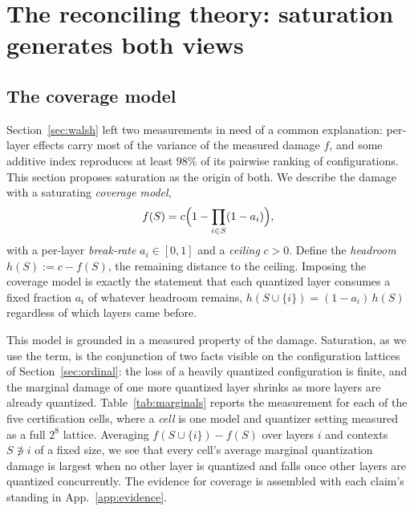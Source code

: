 

\section{The reconciling theory: saturation generates both views}\label{sec:theory}

\subsection{The coverage model}\label{sec:coverage}

Section~\ref{sec:walsh} left two measurements in need of a common explanation: per-layer effects carry
most of the variance of the measured damage $f$, and some additive index reproduces at least $98\%$ of
its pairwise ranking of configurations. This section proposes saturation as the origin of both. We describe the damage with a saturating \emph{coverage model},
\begin{equation}
  f(S) = c\Bigl(1 - \prod_{i\in S}(1 - a_i)\Bigr),
  \label{eq:coverage}
\end{equation}
with a per-layer \emph{break-rate} $a_i\in[0,1]$ and a \emph{ceiling} $c>0$. Define the \emph{headroom}
$h(S) := c - f(S)$, the remaining distance to the ceiling. Imposing the coverage model is exactly the
statement that each quantized layer consumes a fixed fraction $a_i$ of whatever headroom remains,
$h(S\cup\{i\}) = (1-a_i)\,h(S)$ regardless of which layers came before.

This model is grounded in a measured property of the damage. Saturation, as we use the term, is the
conjunction of two facts visible on the configuration lattices of Section~\ref{sec:ordinal}: the loss
of a heavily quantized configuration is finite, and the marginal damage of one more quantized
layer shrinks as more layers are already quantized. Table~\ref{tab:marginals} reports the measurement
for each of the five certification cells, where a \emph{cell} is one model and quantizer setting
measured as a full $2^8$ lattice. Averaging $f(S\cup\{i\}) - f(S)$ over layers $i$
and contexts $S \not\ni i$ of a fixed size, we see that every cell's average marginal quantization
damage is largest when no other layer is quantized and falls once other layers are quantized
concurrently. The
evidence for coverage is assembled with each claim's standing in App.~\ref{app:evidence}.



